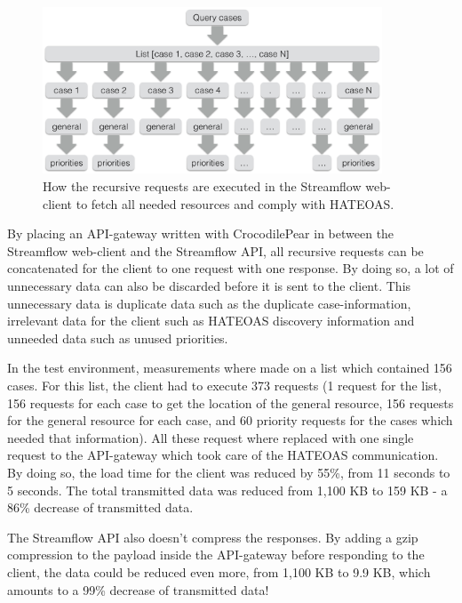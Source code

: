 \documentclass{cslthse-msc}
\begin{document}
\begin{figure}[H]
  \centering
    \begin{center}
      \includegraphics[width=0.9\textwidth]{images/streamflow_cases.png}
    \end{center}
  \caption{How the recursive requests are executed in the Streamflow web-client to fetch all needed resources and comply with HATEOAS.}
\end{figure}

By placing an API-gateway written with CrocodilePear in between the Streamflow web-client and the Streamflow API, all recursive requests can be concatenated for the client to one request with one response. By doing so, a lot of unnecessary data can also be discarded before it is sent to the client. This unnecessary data is duplicate data such as the duplicate case-information, irrelevant data for the client such as HATEOAS discovery information and unneeded data such as unused priorities.

In the test environment, measurements where made on a list which contained 156 cases. For this list, the client had to execute 373 requests (1 request for the list, 156 requests for each case to get the location of the general resource, 156 requests for the general resource for each case, and 60 priority requests for the cases which needed that information). All these request where replaced with one single request to the API-gateway which took care of the HATEOAS communication. By doing so, the load time for the client was reduced by 55\%, from 11 seconds to 5 seconds. The total transmitted data was reduced from 1,100 KB to 159 KB - a 86\% decrease of transmitted data.

The Streamflow API also doesn't compress the responses. By adding a gzip compression to the payload inside the API-gateway before responding to the client, the data could be reduced even more, from 1,100 KB to 9.9 KB, which amounts to a 99\% decrease of transmitted data!
\end{document}
